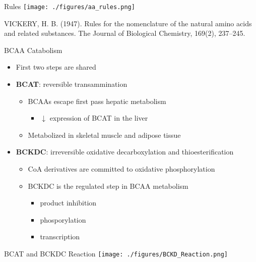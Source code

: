 \documentclass[presentation, smaller]{beamer}
\begin{document}
\begin{frame}[label={sec:orgheadline6}]{Rules}
\texttt{[image: ./figures/aa\_rules.png]}


VICKERY, H. B. (1947). Rules for the nomenclature of the natural amino
acids and related substances. The Journal of Biological Chemistry,
169(2), 237–245.
\end{frame}
\begin{frame}[label={sec:orgheadline7}]{BCAA Catabolism}
\begin{itemize}
\item First two steps are shared
\item \textbf{BCAT}: reversible transammination
\begin{itemize}
\item BCAAs escape first pass hepatic metabolism
\begin{itemize}
\item \(\downarrow\) expression of BCAT in the liver
\end{itemize}
\item Metabolized in skeletal muscle and adipose tissue
\end{itemize}
\item \textbf{BCKDC}: irreversible oxidative decarboxylation and thioesterification
\begin{itemize}
\item CoA derivatives are committed to oxidative phosphorylation
\item BCKDC is the regulated step in BCAA metabolism
\begin{itemize}
\item product inhibition
\item phosporylation
\item transcription
\end{itemize}
\end{itemize}
\end{itemize}
\end{frame}
\begin{frame}[label={sec:orgheadline8}]{BCAT and BCKDC Reaction}
\centering
\texttt{[image: ./figures/BCKD\_Reaction.png]}
\end{frame}
\end{document}
